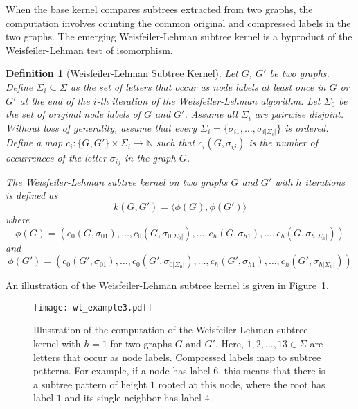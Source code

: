 \documentclass[twoside,11pt]{article}
\newtheorem{definition}{Definition}
\begin{document}
When the base kernel compares subtrees extracted from two graphs, the computation involves counting the common original and compressed labels in the two graphs.
The emerging Weisfeiler-Lehman subtree kernel is a byproduct of the Weisfeiler-Lehman test of isomorphism.
\begin{definition}[Weisfeiler-Lehman Subtree Kernel]
  Let $G$, $G'$ be two graphs.
  Define $\Sigma_i \subseteq \Sigma$ as the set of letters that occur as node labels at least once in $G$ or $G'$ at the end of the $i$-th iteration of the Weisfeiler-Lehman algorithm.
  Let $\Sigma_0$ be the set of original node labels of $G$ and $G'$.
  Assume all $\Sigma_i$ are pairwise disjoint.
  Without loss of generality, assume that every $\Sigma_i = \{ \sigma_{i1},\ldots,\sigma_{i|\Sigma_i|} \}$ is ordered.
  Define a map $c_i : \{ G,G' \} \times \Sigma_i \rightarrow \mathbb{N}$ such that $c_i(G, \sigma_{ij})$ is the number of occurrences of the letter $\sigma_{ij}$ in the graph $G$.

  The Weisfeiler-Lehman subtree kernel on two graphs $G$ and $G'$ with $h$ iterations is defined as
  \begin{equation}
    k(G,G') = \langle \phi(G),\phi(G') \rangle 
  \end{equation}
  where
  \begin{equation}
    \phi(G) = (c_0(G,\sigma_{01}),\ldots,c_0(G,\sigma_{0|\Sigma_0|}),\ldots,c_h(G,\sigma_{h1}),\ldots,c_h(G,\sigma_{h|\Sigma_h|}))
  \end{equation}
  and
  \begin{equation}
    \phi(G') = (c_0(G',\sigma_{01}),\ldots,c_0(G',\sigma_{0|\Sigma_0|}),\ldots,c_h(G',\sigma_{h1}),\ldots,c_h(G',\sigma_{h|\Sigma_h|}))
  \end{equation}
\end{definition}
An illustration of the Weisfeiler-Lehman subtree kernel is given in Figure~\ref{fig:wl_example}.
\begin{figure}[t]
    \centering
    \texttt{[image: wl\_example3.pdf]}
    \caption{Illustration of the computation of the Weisfeiler-Lehman subtree kernel with $h=1$ for two  graphs $G$ and $G'$. Here, $ 1,2,\ldots,13 \in \Sigma$ are letters that occur as node labels. Compressed labels map to subtree patterns. For example, if a node has label $6$, this means that there is a subtree pattern of height $1$ rooted at this node, where the root has label $1$ and its single neighbor has label $4$.}
    \label{fig:wl_example}
\end{figure}
\end{document}
